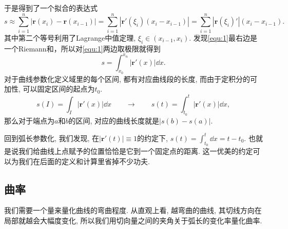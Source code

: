 \documentclass[./main.tex]{subfiles}
\begin{document}
\begin{figure}[!ht]
    \centering
\end{figure}
于是得到了一个拟合的表达式
\begin{equation}\label{equ:1}
    s\approx\sum_{i=1}^n |\mathbf{r}(x_i)-\mathbf{r}(x_{i-1})|=\sum_{i=1}^n |\mathbf{r}'(\xi_i)(x_i-x_{i-1})|=\sum_{i=1}^n |\mathbf{r}(\xi_i)'|(x_i-x_{i-1}).
\end{equation}
其中第二个等号利用了Lagrange中值定理, \(\xi_i\in(x_{i-1},x_i)\). 发现\eqref{equ:1}最右边是一个Riemann和，所以对\eqref{equ:1}两边取极限就得到
\begin{equation}\label{equ:2}
    s=\int_{x_0}^{x_n}|\mathbf{r}'(x)|\dd x.
\end{equation}
对于曲线参数化定义域里的每个区间, 都有对应曲线段的长度, 而由于定积分的可加性, 可以固定区间的起点为\(t_0\).
\[
    s(I)=\int_I|\mathbf{r}'(x)|\dd x\qquad\longrightarrow\qquad s(t)=\int_{t_0}^t|\mathbf{r}'(x)|\dd x,
\]
那么对于端点为\(a\)和\(b\)的区间, 对应的曲线长度就是\(|s(b)-s(a)|\).

回到弧长参数化, 我们发现, 在\(|\mathbf{r}'(t)|\equiv1\)的约定下, \(s(t)=\int_{t_0}^t\dd x=t-t_0\). 也就是说我们给曲线上点赋予的位置恰恰是它到一个固定点的距离. 这一优美的约定可以为我们在后面的定义和计算里省掉不少功夫.
\subsection{曲率}
我们需要一个量来量化曲线的弯曲程度. 从直观上看, 越弯曲的曲线, 其切线方向在局部就越会大幅度变化, 所以我们用切向量之间的夹角关于弧长的变化率量化曲率.
\end{document}
